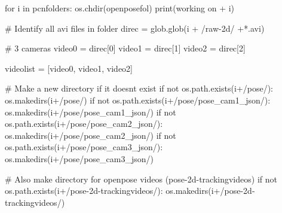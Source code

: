 \documentclass[
  letterpaper,
  DIV=11,
  numbers=noendperiod]{scrreprt}
\newenvironment{Shaded}{\begin{snugshade}}{\end{snugshade}}
\newcommand{\BuiltInTok}[1]{\textcolor[rgb]{0.00,0.23,0.31}{#1}}
\newcommand{\CommentTok}[1]{\textcolor[rgb]{0.37,0.37,0.37}{#1}}
\newcommand{\ControlFlowTok}[1]{\textcolor[rgb]{0.00,0.23,0.31}{#1}}
\newcommand{\DecValTok}[1]{\textcolor[rgb]{0.68,0.00,0.00}{#1}}
\newcommand{\KeywordTok}[1]{\textcolor[rgb]{0.00,0.23,0.31}{#1}}
\newcommand{\NormalTok}[1]{\textcolor[rgb]{0.00,0.23,0.31}{#1}}
\newcommand{\OperatorTok}[1]{\textcolor[rgb]{0.37,0.37,0.37}{#1}}
\newcommand{\StringTok}[1]{\textcolor[rgb]{0.13,0.47,0.30}{#1}}
\begin{document}
\begin{Shaded}
\begin{Highlighting}[]
\ControlFlowTok{for}\NormalTok{ i }\KeywordTok{in}\NormalTok{ pcnfolders:}
\NormalTok{    os.chdir(openposefol)}
    \BuiltInTok{print}\NormalTok{(}\StringTok{\textquotesingle{}working on \textquotesingle{}} \OperatorTok{+}\NormalTok{ i)}

    \CommentTok{\# Identify all avi files in folder}
\NormalTok{    direc }\OperatorTok{=}\NormalTok{ glob.glob(i }\OperatorTok{+} \StringTok{\textquotesingle{}/raw{-}2d/\textquotesingle{}} \OperatorTok{+}\StringTok{\textquotesingle{}*.avi\textquotesingle{}}\NormalTok{)}

    \CommentTok{\# 3 cameras}
\NormalTok{    video0 }\OperatorTok{=}\NormalTok{ direc[}\DecValTok{0}\NormalTok{]}
\NormalTok{    video1 }\OperatorTok{=}\NormalTok{ direc[}\DecValTok{1}\NormalTok{]}
\NormalTok{    video2 }\OperatorTok{=}\NormalTok{ direc[}\DecValTok{2}\NormalTok{]}

\NormalTok{    videolist }\OperatorTok{=}\NormalTok{ [video0, video1, video2]}
    
    \CommentTok{\# Make a new directory if it doesn\textquotesingle{}t exist}
    \ControlFlowTok{if} \KeywordTok{not}\NormalTok{ os.path.exists(i}\OperatorTok{+}\StringTok{\textquotesingle{}/pose/\textquotesingle{}}\NormalTok{):}
\NormalTok{        os.makedirs(i}\OperatorTok{+}\StringTok{\textquotesingle{}/pose/\textquotesingle{}}\NormalTok{)}
    \ControlFlowTok{if} \KeywordTok{not}\NormalTok{ os.path.exists(i}\OperatorTok{+}\StringTok{\textquotesingle{}/pose/pose\_cam1\_json/\textquotesingle{}}\NormalTok{):}
\NormalTok{        os.makedirs(i}\OperatorTok{+}\StringTok{\textquotesingle{}/pose/pose\_cam1\_json/\textquotesingle{}}\NormalTok{)}
    \ControlFlowTok{if} \KeywordTok{not}\NormalTok{ os.path.exists(i}\OperatorTok{+}\StringTok{\textquotesingle{}/pose/pose\_cam2\_json/\textquotesingle{}}\NormalTok{):}
\NormalTok{        os.makedirs(i}\OperatorTok{+}\StringTok{\textquotesingle{}/pose/pose\_cam2\_json/\textquotesingle{}}\NormalTok{)}
    \ControlFlowTok{if} \KeywordTok{not}\NormalTok{ os.path.exists(i}\OperatorTok{+}\StringTok{\textquotesingle{}/pose/pose\_cam3\_json/\textquotesingle{}}\NormalTok{):}
\NormalTok{        os.makedirs(i}\OperatorTok{+}\StringTok{\textquotesingle{}/pose/pose\_cam3\_json/\textquotesingle{}}\NormalTok{)}
    

    \CommentTok{\# Also make directory for openpose videos (pose{-}2d{-}trackingvideos)}
    \ControlFlowTok{if} \KeywordTok{not}\NormalTok{ os.path.exists(i}\OperatorTok{+}\StringTok{\textquotesingle{}/pose{-}2d{-}trackingvideos/\textquotesingle{}}\NormalTok{):}
\NormalTok{        os.makedirs(i}\OperatorTok{+}\StringTok{\textquotesingle{}/pose{-}2d{-}trackingvideos/\textquotesingle{}}\NormalTok{)}


\end{Highlighting}
\end{Shaded}
\end{document}
